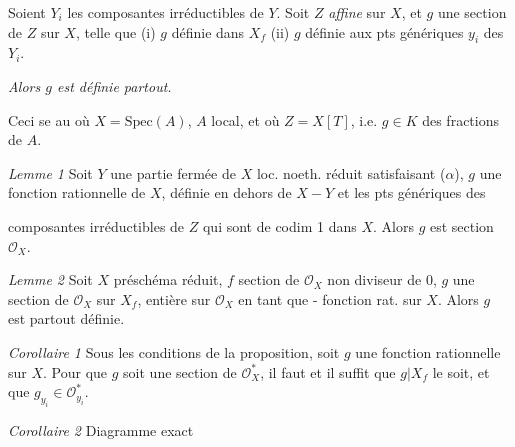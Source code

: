 \documentclass[11pt,a4paper]{article}
\begin{document}
Soient $Y_i$ les composantes irréductibles de $Y$. Soit $Z$ \emph{affine} sur $X$, et $g$ une
section  de $Z$ sur $X$, telle que (i) $g$ définie dans $X_f$ (ii) $g$
définie aux pts génériques $y_i$ des $Y_i$.

\emph{Alors $g$ est définie partout.}


Ceci se  au \ill{} \ill{} où $X=\mathrm{Spec}(A)$, $A$ local, et où
$Z=X[T]$, i.e. $g\in K$  des fractions de $A$.

\emph{Lemme 1} Soit $Y$ une partie fermée \ill{} de $X$ loc. noeth. réduit satisfaisant
($\alpha$),  $g$ une  fonction rationnelle de
$X$, définie en dehors de $X-Y$ et les pts génériques des

composantes irréductibles de $Z$ qui sont de codim 1 dans $X$. Alors $g$ est
 section \ill{} $\mathcal{O}_X$.

\emph{Lemme 2} Soit   $X$ préschéma
 réduit, $f$ section de $\mathcal{O}_X$ non diviseur de $0$,  $g$ une section de $\mathcal{O}_X$
sur $X_f$, entière sur $\mathcal{O}_X$ en tant que  -
\struck{\ill{}} fonction rat. sur $X$. Alors $g$ est partout définie.

\emph{Corollaire 1} Sous les conditions de la proposition, soit $g$ une fonction rationnelle
sur $X$. Pour que $g$ soit une section de $\mathcal{O}_X^*$, il faut et il suffit que
$g|X_f$ le soit, et que \ill{} $g_{y_i}\in\mathcal{O}^*_{y_i}$. \struck{\ill{}}

\emph{Corollaire 2} Diagramme exact


\end{document}
